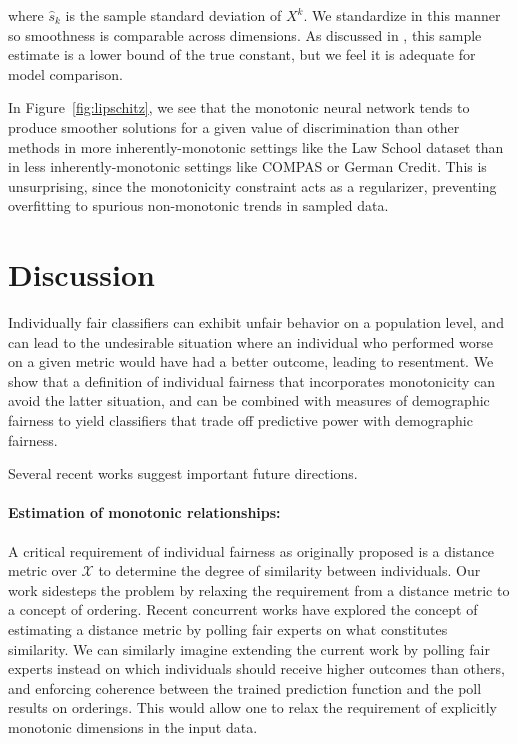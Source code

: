         where $\hat{s}_k$ is the sample standard deviation of $X^k$. We standardize in this manner so smoothness is comparable across dimensions.   As discussed in \cite{zhang2019recurjac}, this sample estimate is a lower bound of the true constant, but we feel it is adequate for model comparison.
        
        In Figure~\ref{fig:lipschitz}, we see that the monotonic neural network tends to produce smoother solutions for a given value of discrimination than other methods in more inherently-monotonic settings like the Law School dataset than in less inherently-monotonic settings like COMPAS or German Credit.  This is unsurprising, since the monotonicity constraint acts as a regularizer, preventing overfitting to spurious non-monotonic trends in sampled data.

\section{Discussion}

    Individually fair classifiers can exhibit unfair behavior on a population level, and can lead to the undesirable situation where an individual who performed worse on a given metric would have had a better outcome, leading to resentment. We show that a definition of individual fairness that incorporates monotonicity can avoid the latter situation, and can be combined with measures of demographic fairness to yield classifiers that trade off predictive power with demographic fairness.
    
    Several recent works suggest important future directions.
    
    \paragraph{Estimation of monotonic relationships:} 
        A critical requirement of individual fairness as originally proposed \cite{dwork2012fairness} is a distance metric over $\mathcal{X}$ to determine the degree of similarity between individuals.  Our work sidesteps the problem by relaxing the requirement from a distance metric to a concept of ordering.  Recent concurrent works \cite{jung2019eliciting,ilvento2019metric} have explored the concept of estimating a distance metric by polling fair experts on what constitutes similarity.  We can similarly imagine extending the current work by polling fair experts instead on which individuals should receive higher outcomes than others, and enforcing coherence between the trained prediction function and the poll results on orderings.  This would allow one to relax the requirement of explicitly monotonic dimensions in the input data.
    
